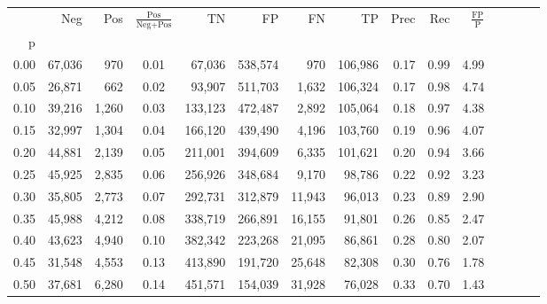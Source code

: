\begin{tabular}{rrrcrrrrrrrrrrr}
\toprule
{} &     Neg &     Pos & $\frac{\text{Pos}}{\text{Neg}+\text{Pos}}$ &       TN &       FP &       FN &       TP &  Prec &   Rec & $\frac{\text{FP}}{\text{P}}$ \\
p    &         &         &                                            &          &          &          &          &       &       &                              \\
\midrule
0.00 &  67,036 &     970 &                                       0.01 &   67,036 &  538,574 &      970 &  106,986 &  0.17 &  0.99 &                         4.99 \\
0.05 &  26,871 &     662 &                                       0.02 &   93,907 &  511,703 &    1,632 &  106,324 &  0.17 &  0.98 &                         4.74 \\
0.10 &  39,216 &   1,260 &                                       0.03 &  133,123 &  472,487 &    2,892 &  105,064 &  0.18 &  0.97 &                         4.38 \\
0.15 &  32,997 &   1,304 &                                       0.04 &  166,120 &  439,490 &    4,196 &  103,760 &  0.19 &  0.96 &                         4.07 \\
0.20 &  44,881 &   2,139 &                                       0.05 &  211,001 &  394,609 &    6,335 &  101,621 &  0.20 &  0.94 &                         3.66 \\
0.25 &  45,925 &   2,835 &                                       0.06 &  256,926 &  348,684 &    9,170 &   98,786 &  0.22 &  0.92 &                         3.23 \\
0.30 &  35,805 &   2,773 &                                       0.07 &  292,731 &  312,879 &   11,943 &   96,013 &  0.23 &  0.89 &                         2.90 \\
0.35 &  45,988 &   4,212 &                                       0.08 &  338,719 &  266,891 &   16,155 &   91,801 &  0.26 &  0.85 &                         2.47 \\
0.40 &  43,623 &   4,940 &                                       0.10 &  382,342 &  223,268 &   21,095 &   86,861 &  0.28 &  0.80 &                         2.07 \\
0.45 &  31,548 &   4,553 &                                       0.13 &  413,890 &  191,720 &   25,648 &   82,308 &  0.30 &  0.76 &                         1.78 \\
0.50 &  37,681 &   6,280 &                                       0.14 &  451,571 &  154,039 &   31,928 &   76,028 &  0.33 &  0.70 &                         1.43 \\

\end{tabular}
